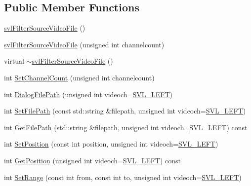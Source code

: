 \subsection*{Public Member Functions}
\begin{DoxyCompactItemize}
\item 
\hyperlink{classsvl_filter_source_video_file_a4ae5b43e23aeca2412c8e779bddd35c6}{svl\-Filter\-Source\-Video\-File} ()
\item 
\hyperlink{classsvl_filter_source_video_file_ad9220ec0d2646113193398e16c7f0811}{svl\-Filter\-Source\-Video\-File} (unsigned int channelcount)
\item 
virtual \hyperlink{classsvl_filter_source_video_file_a3a1d53fa0e67675d1bbf6d85f1603602}{$\sim$svl\-Filter\-Source\-Video\-File} ()
\item 
int \hyperlink{classsvl_filter_source_video_file_a1dbbaea65873ac946978835fe99825f6}{Set\-Channel\-Count} (unsigned int channelcount)
\item 
int \hyperlink{classsvl_filter_source_video_file_ad333c5d32e7af1a6cdb77e9fde5dbd7d}{Dialog\-File\-Path} (unsigned int videoch=\hyperlink{svl_definitions_8h_ab9fec7615f19c8df2919eebcab0b187f}{S\-V\-L\-\_\-\-L\-E\-F\-T})
\item 
int \hyperlink{classsvl_filter_source_video_file_a43013197d2bcd8e9168fc2449a647e1e}{Set\-File\-Path} (const std\-::string \&filepath, unsigned int videoch=\hyperlink{svl_definitions_8h_ab9fec7615f19c8df2919eebcab0b187f}{S\-V\-L\-\_\-\-L\-E\-F\-T})
\item 
int \hyperlink{classsvl_filter_source_video_file_a34f297adfdfa4bbb335078e4941b7a52}{Get\-File\-Path} (std\-::string \&filepath, unsigned int videoch=\hyperlink{svl_definitions_8h_ab9fec7615f19c8df2919eebcab0b187f}{S\-V\-L\-\_\-\-L\-E\-F\-T}) const 
\item 
int \hyperlink{classsvl_filter_source_video_file_aa0036ad697898a0ec132843293562a20}{Set\-Position} (const int position, unsigned int videoch=\hyperlink{svl_definitions_8h_ab9fec7615f19c8df2919eebcab0b187f}{S\-V\-L\-\_\-\-L\-E\-F\-T})
\item 
int \hyperlink{classsvl_filter_source_video_file_a685667f2173c9a6096f7ab80dfdb9a77}{Get\-Position} (unsigned int videoch=\hyperlink{svl_definitions_8h_ab9fec7615f19c8df2919eebcab0b187f}{S\-V\-L\-\_\-\-L\-E\-F\-T}) const 
\item 
int \hyperlink{classsvl_filter_source_video_file_a9503b15a4f762f2a6a8da06c3bf3f281}{Set\-Range} (const int from, const int to, unsigned int videoch=\hyperlink{svl_definitions_8h_ab9fec7615f19c8df2919eebcab0b187f}{S\-V\-L\-\_\-\-L\-E\-F\-T})

\end{DoxyCompactItemize}
